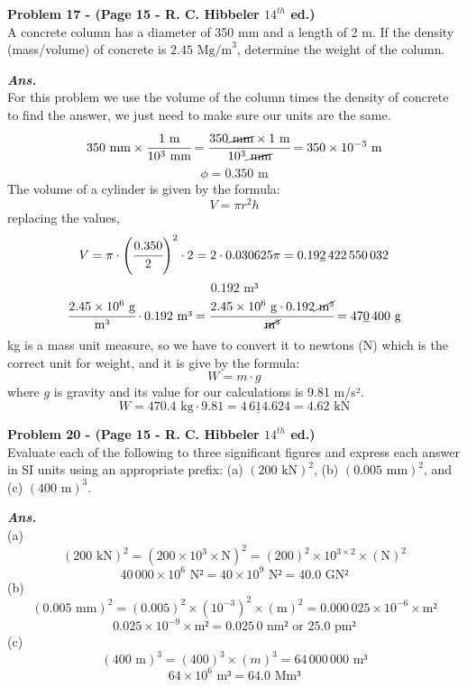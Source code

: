 \documentclass[letterpaper, 11pt]{article}
\newenvironment{problem}[2][Problem]
    { \begin{mdframed} \textbf{#1 #2} \\}
    {  \end{mdframed}}
\newenvironment{solution}
    {\textbf{\textit{Ans.}}\\}
    { }
\begin{document}
\begin{problem}{17 - (Page 15 - R. C. Hibbeler $14^{th}$ ed.)}
    A concrete column has a diameter of 350 mm and
    a length of 2 m. If the density (mass/volume) of concrete is
    $2.45\text{ Mg/m}^3$, determine the weight of the column.
\end{problem}
\begin{solution}
    For this problem we use the volume of the column times the density of concrete to find the answer, we just need to make sure our units are the same.
\[350 \text{ mm}\times \cfrac{1\text{ m}}{10^3 \text{ mm}}=\cfrac{350 \cancel{\text{ mm}} \times 1\text{ m}}{10^3 \cancel{\text{ mm}}}=350 \times 10^{-3} \text{ m}\]
\[\phi =  0.350 \text{ m}\]
The volume of a cylinder is given by the formula:
\[V=\pi r^2 h\]
replacing the values,
\[V=\pi \cdot \left(\cfrac{0.350}{2}\right)^2 \cdot 2=2\cdot 0.030625\pi=0.19\underline{2}\,422\,550\,032\]
\[0.192\text{ m³}\]
\[\cfrac{2.45 \times 10^6 \text{ g}}{\text{m³}} \cdot 0.192 \text{ m³}=\cfrac{2.45 \times 10^6 \text{ g}\cdot 0.192 \cancel{\text{ m³}}}{\cancel{\text{m³}}} =47\underline{0}\,400\text{ g}\]
kg is a mass unit measure, so we have to convert it to newtons (N) which is the correct unit for weight, and it is give by the formula:
\[W=m\cdot g\]
where $g$ is gravity and its value for our calculations is 9.81 m/s².
\[W=470.4 \text{ kg} \cdot 9.81 = 4\, 6\underline{1}4.624=\boxed{4.62 \text{ kN}}\]
\end{solution}
\begin{problem}{20 - (Page 15 - R. C. Hibbeler $14^{th}$ ed.)}
    Evaluate each of the following to three significant
figures and express each answer in SI units using an
appropriate prefix: (a) $(200 \text{ kN})^2$, (b) $(0.005\text{ mm})^2$, and (c)
$(400\text{ m})^3$.
\end{problem}
\begin{solution}
 (a)
 \[(200 \text{ kN})^2=(200 \times 10^3 \times \text{N})^2=(200)^2\times 10^{3\times 2}\times (\text{N})^2\]
 \[40\, 000 \times 10^6 \text{ N²} =40 \times 10^9 \text{ N²}=\boxed{ 40.0 \text{ GN²}}\]
 (b)
 \[(0.005\text{ mm})^2=(0.005)^2 \times (10^{-3})^2 \times (\text{m})^2 =0.000\,025 \times 10^{-6} \times \text{m²}\]
 \[0.025 \times 10^{-9}\times\text{m²}=\boxed{0.025\,0 \text{ nm²}}\text{ or } \boxed{25.0 \text{ pm²}}\]
 (c)
 \[(400\text{ m})^3=(400)^3\times(m)^3=64\,000\,000\text{ m³}\]
 \[64 \times 10^6 \text{ m³}=\boxed{ 64.0 \text{ Mm³}}\]
\end{solution}
\end{document}
